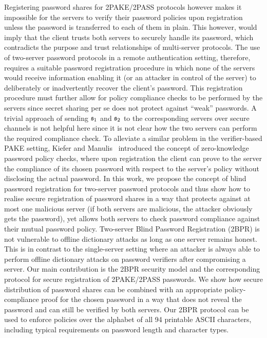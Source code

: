 Registering password shares for 2PAKE/2PASS protocols however makes it impossible for the servers to verify their password policies upon registration unless the password is transferred to each of them in plain. 
This however, would imply that the client trusts both servers to securely handle its password, which contradicts the purpose and trust relationships of multi-server protocols.
The use of two-server password protocols in a remote authentication setting, therefore, requires a suitable password registration procedure in which none of the servers would receive information enabling it (or an attacker in control of the server) to deliberately or inadvertently recover the client's password.
This registration procedure must further allow for policy compliance checks to be performed by the servers since secret sharing per se does not protect against ``weak'' passwords.
A trivial approach of sending $\mathfrak{s}_1$ and $\mathfrak{s}_2$ to the corresponding servers over secure channels is not helpful here since it is not clear how the two servers can perform the required compliance check.
To alleviate a similar problem in the verifier-based PAKE setting, Kiefer and Manulis~\cite{KieferM14c} introduced the concept of zero-knowledge password policy checks, where upon registration the client can prove to the server the compliance of its chosen password with respect to the server's policy without disclosing the actual password.
In this work, we propose the concept of blind password registration for two-server password protocols and thus show how to realise secure registration of password shares in a way that protects against at most one malicious server (if both servers are malicious, the attacker obviously gets the password), yet allows both servers to check password compliance against their mutual password policy.
Two-server Blind Password Registration (2BPR) is not vulnerable to offline dictionary attacks as long as one server remains honest.
This is in contrast to the single-server setting where an attacker is always able to perform offline dictionary attacks on password verifiers after compromising a server. %
Our main contribution is the 2BPR security model and the corresponding protocol for secure registration of 2PAKE/2PASS passwords. We show how secure distribution of password shares can be combined with an appropriate policy-compliance proof for the chosen password in a way that does not reveal the password and can still be verified by both servers.
Our 2BPR protocol can be used to enforce policies over the alphabet of all 94 printable ASCII characters, including typical requirements on password length and character types.


